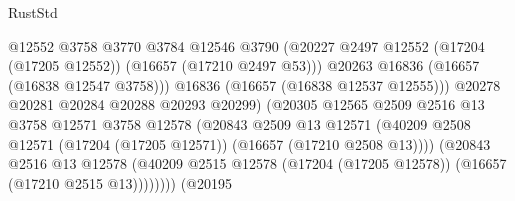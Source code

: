 \begin{lexlean}{RustStd}
\begin{coremodule}
                                            @12552
                                            @3758
                                            @3770
                                            @3784
                                            @12546
                                            @3790
                                            (@20227
                                              @2497
                                              @12552
                                              (@17204 (@17205 @12552))
                                              (@16657 (@17210 @2497 @53)))
                                            @20263
                                            @16836
                                            (@16657 (@16838 @12547 @3758)))
                                          @16836
                                          (@16657 (@16838 @12537 @12555)))
                                        @20278
                                        @20281
                                        @20284
                                        @20288
                                        @20293
                                        @20299)
                                      (@20305
                                        @12565
                                        @2509
                                        @2516
                                        @13
                                        @3758
                                        @12571
                                        @3758
                                        @12578
                                        (@20843
                                          @2509
                                          @13
                                          @12571
                                          (@40209
                                            @2508
                                            @12571
                                            (@17204 (@17205 @12571))
                                            (@16657 (@17210 @2508 @13))))
                                        (@20843
                                          @2516
                                          @13
                                          @12578
                                          (@40209
                                            @2515
                                            @12578
                                            (@17204 (@17205 @12578))
                                            (@16657 (@17210 @2515 @13))))))))
                                (@20195

\end{coremodule}
\end{lexlean}
